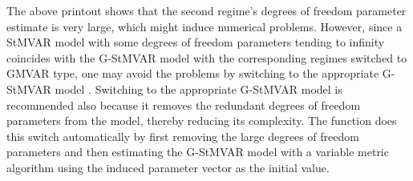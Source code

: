 \documentclass[nojss]{jss}
\begin{document}
The above printout shows that the second regime's degrees of freedom parameter estimate is very large, which might induce numerical problems. However, since a StMVAR model with some degrees of freedom parameters tending to infinity coincides with the G-StMVAR model with the corresponding regimes switched to GMVAR type, one may avoid the problems by switching to the appropriate G-StMVAR model \citep[see][]{Virolainen2:2021}. Switching to the appropriate G-StMVAR model is recommended also because it removes the redundant degrees of freedom parameters from the model, thereby reducing its complexity. The function  does this switch automatically by first removing the large degrees of freedom parameters and then estimating the G-StMVAR model with a variable metric algorithm \citep[algorithm 21]{Nash:1990} using the induced parameter vector as the initial value.
\end{document}
